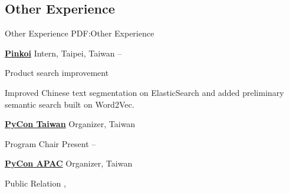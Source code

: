 \documentclass[a4paper,10pt,oneside]{article}
\begin{document}
\begin{body}
%


\section
{Other Experience}
{Other Experience}
{PDF:Other Experience}

\href{http://pinkoi.com}
{\textbf{Pinkoi}} Intern,
Taipei, Taiwan
\hfill
{} --
\par
Product search improvement
\begin{detail}
    \begin{detailitem}
    \item Improved Chinese text segmentation on ElasticSearch and added
        preliminary semantic search built on Word2Vec.
    \end{detailitem}
\end{detail}

\EntryGap
\href{http://pycon.tw}{\textbf{PyCon Taiwan}} Organizer, Taiwan
\par
Program Chair
\hfill
Present --

\EntryGap
\href{http://pycon.tw}{\textbf{PyCon APAC}} Organizer, Taiwan
\par
Public Relation
\hfill
{},


\end{body}
\end{document}
